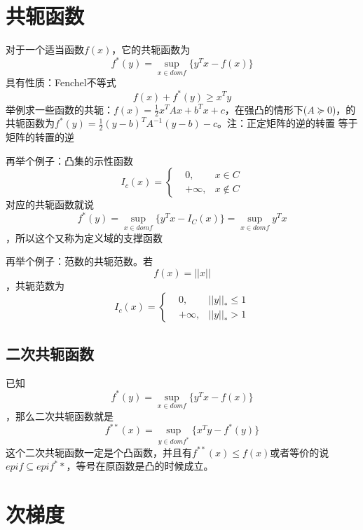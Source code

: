 \documentclass{article}
\begin{document}
\section{共轭函数}
对于一个适当函数$f(x)$，它的共轭函数为$$f^*(y)=\sup\limits_{x \in dom f}\{y^Tx-f(x)\}$$
具有性质：Fenchel不等式
$$f(x)+f^*(y) \ge x^Ty $$
举例求一些函数的共轭：$f(x)=\frac{1}{2}x^TAx+b^Tx+c$，在强凸的情形下($A \succeq 0$)，的共轭函数为$f^*(y)=\frac{1}{2}(y-b)^TA^{-1}(y-b)-c$。注：正定矩阵的逆的转置 等于 矩阵的转置的逆

再举个例子：凸集的示性函数
\begin{equation}
   I_c(x)=\left\{
    \begin{aligned}
        &0, &x \in C \\
        &+\infty , &x \notin C
    \end{aligned} 
   \right.
\end{equation}
对应的共轭函数就说$$f^*(y)=\sup\limits_{x \in dom f}\{y^Tx-I_C(x)\}=\sup\limits_{x \in dom f}y^Tx$$，所以这个又称为定义域的支撑函数

再举个例子：范数的共轭范数。若$$f(x)=||x||$$，共轭范数为
\begin{equation}
    I_c(x)=\left\{
     \begin{aligned}
         &0, &||y||_* \le 1 \\
         &+\infty ,&||y||_* > 1
     \end{aligned} 
    \right.
\end{equation}
\subsection{二次共轭函数}
已知$$f^*(y)=\sup\limits_{x \in dom f}\{y^Tx-f(x)\}$$，那么二次共轭函数就是
$$f^{**}(x)=\sup\limits_{y \in dom f^*}\{x^Ty-f^*(y)\}$$
这个二次共轭函数一定是个凸函数，并且有$f^{**}(x) \le f(x)$或者等价的说$epi f \subseteq epi f^**$，等号在原函数是凸的时候成立。
\section{次梯度}
\end{document}
